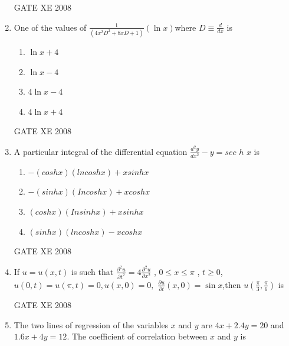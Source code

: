 \documentclass[12pt]{article}
\begin{document}
\begin{enumerate}[label=Q\arabic*.]
GATE XE 2008
\item  One of the values of  $\frac{1}{(4x^2D^2 + 8xD+1)}(\ln{x})$where $D\equiv \frac{d}{dx}$ is

\begin{enumerate}[label=(\Alph*)]
\item  $\ln{x} +4$
\item $\ln{x} -4$
\item $4\ln{x} -4$
\item $4\ln{x} +4$
\end{enumerate}

GATE XE 2008
\item  A particular integral of the differential equation {\large $\frac{d^2y}{dx^2} - y = sec$ $h$ $x$} is

\begin{enumerate}[label=(\Alph*)]
\item $- (cosh x) (ln cosh x) + xsinhx$
\item $- (sinh x) (Incosh x) + xcosh x$
\item $(cosh x) (Insinh x) + xsinh x$
\item $(sinh x) (ln cosh x) - x cosh x$
\end{enumerate}

GATE XE 2008
\item If $u=u(x,t)$ is such that $\frac{\partial^2 u}{\partial t^2} = 4\frac{\partial^2 u}{\partial x^2}$ , $0\leq x \leq \pi$ , $t \geq 0$, \newline $u(0,t)=u(\pi , t)=0,$\newline $u(x,0)=0,$ \newline $\frac{\partial u}{\partial t}(x,0)=\sin{x}$,\newline then $u(\frac{\pi}{3}, \frac{\pi}{6})$ is

\begin{enumerate}[label=(\Alph*)]
\end{enumerate}


GATE XE 2008
\item The two lines of regression of the variables $x$ and $y$ are
$4x+2.4y = 20$ and $1.6x +4y =12$.
The coefficient of correlation between $x$ and $y$ is


\end{enumerate}
\end{document}
